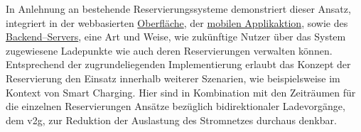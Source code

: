 In Anlehnung an bestehende Reservierungssysteme demonstriert dieser Ansatz, integriert in der webbasierten \href{https://github.com/JulianHBuecher/ev-dashboard/tree/reservation-process}{Oberfl\"ache}, der \href{https://github.com/JulianHBuecher/ev-mobile/tree/reservation-process}{mobilen Applikaktion}, sowie des \href{https://github.com/JulianHBuecher/ev-server/tree/reservation-process}{Backend--Servers}, eine Art und Weise, wie zuk\"unftige Nutzer \"uber das System zugewiesene Ladepunkte wie auch deren Reservierungen verwalten k\"onnen.\\
Entsprechend der zugrundeliegenden Implementierung erlaubt das Konzept der Reservierung den Einsatz innerhalb weiterer Szenarien, wie beispielsweise im Kontext von Smart Charging. Hier sind in Kombination mit den Zeitr\"aumen für die einzelnen Reservierungen Ans\"atze bez\"uglich bidirektionaler Ladevorg\"ange, dem \acrfull{v2g}, zur Reduktion der Auslastung des Stromnetzes durchaus denkbar.
